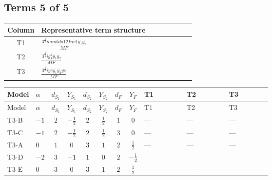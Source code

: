 \documentclass[8pt]{article}
\begin{document}
\begin{landscape}
\subsection*{Terms 5 of 5}
\begin{center}
\begin{tabular}{@{}c >{\raggedright\arraybackslash}p{0.82\linewidth}@{}}
\toprule
Column & Representative term structure \\
\midrule
T1 & \(\displaystyle \frac{3^{\frac{3}{4}} i lambda12Inv1 \overline{y_{1}} \overline{y_{2}}}{MF}\) \\
\midrule
T2 & \(\displaystyle \frac{3^{\frac{3}{4}} i g_{1}^{2} \overline{y_{1}} \overline{y_{2}}}{MF}\) \\
\midrule
T3 & \(\displaystyle \frac{3^{\frac{3}{4}} i ye \overline{y_{1}} \overline{y_{2}} \overline{ye}}{MF}\) \\
\midrule
\bottomrule
\end{tabular}
\end{center}
\smallskip
\tiny
\begin{longtable}{@{}llcccccc >{\raggedright\arraybackslash}p{0.21\linewidth} >{\raggedright\arraybackslash}p{0.21\linewidth} >{\raggedright\arraybackslash}p{0.21\linewidth}@{}}
\toprule
Model & $\alpha$ & $d_{S_1}$ & $Y_{S_1}$ & $d_{S_2}$ & $Y_{S_2}$ & $d_F$ & $Y_F$ & T1 & T2 & T3 \\
\midrule
\endfirsthead
\toprule
Model & $\alpha$ & $d_{S_1}$ & $Y_{S_1}$ & $d_{S_2}$ & $Y_{S_2}$ & $d_F$ & $Y_F$ & T1 & T2 & T3 \\
\midrule
\endhead
T3-B & $-1$ & $2$ & $-\frac{1}{2}$ & $2$ & $\frac{1}{2}$ & $1$ & $0$ & --- & --- & --- \\
\midrule
T3-C & $-1$ & $2$ & $-\frac{1}{2}$ & $2$ & $\frac{1}{2}$ & $3$ & $0$ & --- & --- & --- \\
\midrule
T3-A & $0$ & $1$ & $0$ & $3$ & $1$ & $2$ & $\frac{1}{2}$ & --- & --- & --- \\
\midrule
T3-D & $-2$ & $3$ & $-1$ & $1$ & $0$ & $2$ & $-\frac{1}{2}$ & \scriptsize\adjustbox{max width=\linewidth}{$\begin{gathered} - \frac{3^{\frac{3}{4}} i lambda12Inv1 \overline{y_{1}} \overline{y_{2}}}{6 MF}\end{gathered}$} & \scriptsize\adjustbox{max width=\linewidth}{$\begin{gathered} - \frac{3^{\frac{3}{4}} i g_{1}^{2} \overline{y_{1}} \overline{y_{2}}}{8 MF}\end{gathered}$} & \scriptsize\adjustbox{max width=\linewidth}{$\begin{gathered} \frac{3^{\frac{3}{4}} i ye \overline{y_{1}} \overline{y_{2}} \overline{ye}}{12 MF}\end{gathered}$} \\
\midrule
T3-E & $0$ & $3$ & $0$ & $3$ & $1$ & $2$ & $\frac{1}{2}$ & --- & --- & --- \\
\midrule
\bottomrule
\end{longtable}
\clearpage

\end{landscape}
\end{document}
